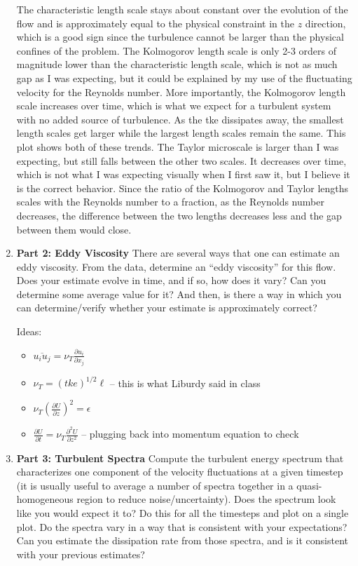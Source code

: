 \documentclass[11pt]{article}
\begin{document}
\begin{enumerate}
    The characteristic length scale stays about constant over the evolution of the flow and is approximately equal to the physical constraint in the $z$ direction, which is a good sign since the turbulence cannot be larger than the physical confines of the problem. The Kolmogorov length scale is only 2-3 orders of magnitude lower than the characteristic length scale, which is not as much gap as I was expecting, but it could be explained by my use of the fluctuating velocity for the Reynolds number. More importantly, the Kolmogorov length scale increases over time, which is what we expect for a turbulent system with no added source of turbulence. As the tke dissipates away, the smallest length scales get larger while the largest length scales remain the same. This plot shows both of these trends. The Taylor microscale is larger than I was expecting, but still falls between the other two scales. It decreases over time, which is not what I was expecting visually when I first saw it, but I believe it is the correct behavior. Since the ratio of the Kolmogorov and Taylor lengths scales with the Reynolds number to a fraction, as the Reynolds number decreases, the difference between the two lengths decreases less and the gap between them would close.
    
    

    \item \textbf{Part 2: Eddy Viscosity} There are several ways that one can estimate an eddy viscosity. From the data, determine an ``eddy viscosity'' for this flow. Does your estimate evolve in time, and if so, how does it vary? Can you determine some average value for it? And then, is there a way in which you can determine/verify whether your estimate is approximately correct?
    
    Ideas:
    \begin{itemize}
        \item $\overline{u_i u_j} = \nu_T \frac{\partial u_i}{\partial x_j}$
        \item $\nu_T = \left( tke \right)^{1/2} \ell$ -- this is what Liburdy said in class
        \item $\nu_T \left( \frac{\partial U}{\partial z} \right)^{2} = \epsilon$
        \item $\frac{\partial U}{\partial t} = \nu_T\frac{\partial^2 U}{\partial z^2}$ -- plugging back into momentum equation to check
    \end{itemize}
    

    \item \textbf{Part 3: Turbulent Spectra} Compute the turbulent energy spectrum that characterizes one component of the velocity fluctuations at a given timestep (it is usually useful to average a number of spectra together in a quasi-homogeneous region to reduce noise/uncertainty). Does the spectrum look like you would expect it to? Do this for all the timesteps and plot on a single plot. Do the spectra vary in a way that is consistent with your expectations? Can you estimate the dissipation rate from those spectra, and is it consistent with your previous estimates?
    

\end{enumerate}
\end{document}

